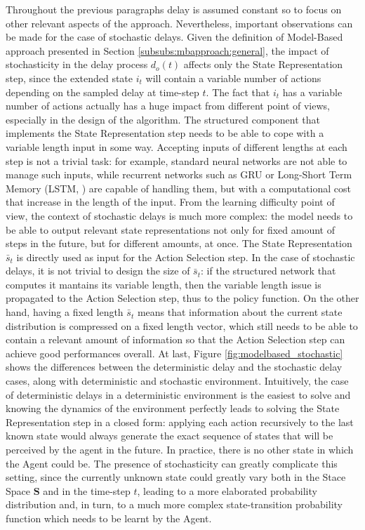                 Throughout the previous paragraphs delay is assumed constant so to focus on other relevant aspects of the approach. Nevertheless, important observations can be made for the case of stochastic delays. Given the definition of Model-Based approach presented in Section \ref{subsubs:mbapproach:general}, the impact of stochasticity in the delay process $d_o(t)$ affects only the State Representation step, since the extended state $i_t$ will contain a variable number of actions depending on the sampled delay at time-step $t$. The fact that $i_t$ has a variable number of actions actually has a huge impact from different point of views, especially in the design of the algorithm. \newline
                The structured component that implements the State Representation step needs to be able to cope with a variable length input in some way. Accepting inputs of different lengths at each step is not a trivial task: for example, standard neural networks are not able to manage such inputs, while recurrent networks such as GRU or Long-Short Term Memory (LSTM, ) are capable of handling them, but with a computational cost that increase in the length of the input. From the learning difficulty point of view, the context of stochastic delays is much more complex: the model needs to be able to output relevant state representations not only for fixed amount of steps in the future, but for different amounts, at once. \newline
                The State Representation $\bar{s}_t$ is directly used as input for the Action Selection step. In the case of stochastic delays, it is not trivial to design the size of $\bar{s}_t$: if the structured network that computes it  mantains its variable length, then the variable length issue is propagated to the Action Selection step, thus to the policy function. On the other hand, having a fixed length $\bar{s}_t$ means that information about the current state distribution is compressed on a fixed length vector, which still needs to be able to contain a relevant amount of information so that the Action Selection step can achieve good performances overall. \newline
                At last, Figure \ref{fig:modelbased_stochastic} shows the differences between the deterministic delay and the stochastic delay cases, along with deterministic and stochastic environment. Intuitively, the case of deterministic delays in a deterministic environment is the easiest to solve and knowing the dynamics of the environment perfectly leads to solving the State Representation step in a closed form: applying each action recursively to the last known state would always generate the exact sequence of states that will be perceived by the agent in the future. In practice, there is no other state in which the Agent could be. The presence of stochasticity can greatly complicate this setting, since the currently unknown state could greatly vary both in the Stace Space $\mathbf{S}$ and in the time-step $t$, leading to a more elaborated probability distribution and, in turn, to a much more complex state-transition probability function which needs to be learnt by the Agent. 
                
